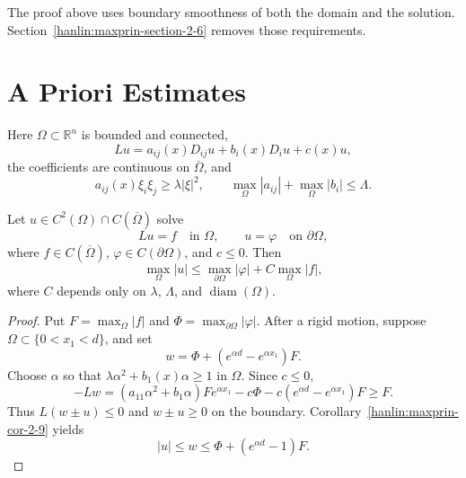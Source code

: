 \begin{remark}\label{hanlin:maxprin-remark-2-23}
The proof above uses boundary smoothness of both the domain and the solution.
Section~\ref{hanlin:maxprin-section-2-6} removes those requirements.
\end{remark}

\section{A Priori Estimates}\label{hanlin:maxprin-section-2-3}

Here $\Omega\subset\mathbb R^n$ is bounded and connected,
\[
Lu=a_{ij}(x)D_{ij}u+b_i(x)D_iu+c(x)u,
\]
the coefficients are continuous on $\overline\Omega$, and
\[
a_{ij}(x)\xi_i\xi_j\ge\lambda|\xi|^2,
\qquad
\max_\Omega|a_{ij}|+\max_\Omega|b_i|\le\Lambda.
\]

\begin{theorem}\label{hanlin:maxprin-theorem-2-24}


Let $u\in C^2(\Omega)\cap C(\overline\Omega)$ solve
\[
Lu=f\quad\text{in }\Omega,
\qquad
u=\varphi\quad\text{on }\partial\Omega,
\]
where $f\in C(\overline\Omega)$, $\varphi\in C(\partial\Omega)$, and $c\le0$.
Then
\[
\max_\Omega|u|\le\max_{\partial\Omega}|\varphi|+C\max_\Omega|f|,
\]
where $C$ depends only on $\lambda$, $\Lambda$, and
$\operatorname{diam}(\Omega)$.
\end{theorem}
\begin{proof}
\sketch Put $F=\max_\Omega|f|$ and
$\Phi=\max_{\partial\Omega}|\varphi|$. After a rigid motion, suppose
$\Omega\subset\{0<x_1<d\}$, and set
\[
w=\Phi+(e^{\alpha d}-e^{\alpha x_1})F.
\]
Choose $\alpha$ so that $\lambda\alpha^2+b_1(x)\alpha\ge1$ in $\Omega$.
Since $c\le0$,
\[
-Lw=(a_{11}\alpha^2+b_1\alpha)Fe^{\alpha x_1}
-c\Phi-c(e^{\alpha d}-e^{\alpha x_1})F\ge F.
\]
Thus $L(w\pm u)\le0$ and $w\pm u\ge0$ on the boundary.
Corollary~\ref{hanlin:maxprin-cor-2-9} yields
\[
|u|\le w\le\Phi+(e^{\alpha d}-1)F.
\]
\end{proof}

